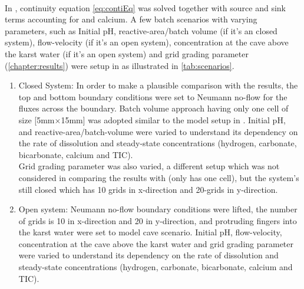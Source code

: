 \paragraph*{\DuMuX} In \DuMuX, continuity equation \ref{eq:contiEq} was solved together with source and sink terms accounting for  and calcium. A few batch scenarios with varying parameters, such as Initial pH, reactive-area/batch volume (if it's an closed system), flow-velocity (if it's an open system),  concentration at the cave above the karst water (if it's an open system) and grid grading parameter (\ref{chapter:results}) were setup in \DuMuX as illustrated in \cref{tab:scenarios}. 
\begin{enumerate}
    \item Closed System: In order to make a plausible comparison with the \MATLAB results, the top and bottom boundary conditions were set to Neumann no-flow for the fluxes across the boundary. Batch volume approach having only one cell of size [5mm$\times$15mm] was adopted similar to the model setup in \MATLAB. Initial pH, and reactive-area/batch-volume were varied to understand its dependency on the rate of dissolution and steady-state concentrations (hydrogen, carbonate, bicarbonate, calcium and TIC).\\
    Grid grading parameter was also varied, a different setup which was not considered in comparing the results with \MATLAB (\MATLAB only has one cell), but the system's still closed which has 10 grids in x-direction and 20-grids in y-direction. 
    \item Open system: Neumann no-flow boundary conditions were lifted, the number of grids is 10 in x-direction and 20 in y-direction, and  protruding  fingers into the karst water were set to model cave scenario. Initial pH, flow-velocity,  concentration at the cave above the karst water and grid grading parameter were varied to understand its dependency on the rate of dissolution and steady-state concentrations (hydrogen, carbonate, bicarbonate, calcium and TIC).
\end{enumerate}


